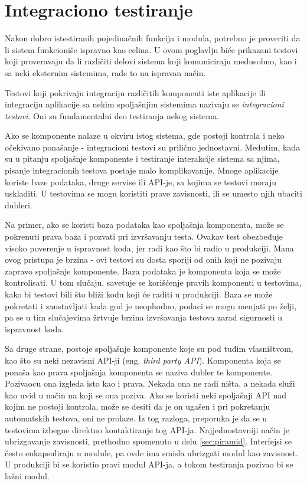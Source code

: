 \documentclass[12pt,oneside]{memoir}
\begin{document}
\section{Integraciono testiranje}
\label{sec:integration}
\par Nakon dobro istestiranih pojedinačnih funkcija i modula, potrebno je proveriti da li sistem funkcioniše ispravno kao celina. U ovom poglavlju biće prikazani testovi koji proveravaju da li različiti delovi sistema koji komuniciraju međusobno, kao i sa neki eksternim sistemima, rade to na ispravan način. 
\par Testovi koji pokrivaju integraciju različitih komponenti iste aplikacije ili integraciju aplikacije sa nekim spoljašnjim sistemima nazivaju se \emph{ integracioni testovi}.  Oni su fundamentalni deo testiranja nekog sistema. 
\par Ako se komponente nalaze u okviru istog sistema, gde postoji kontrola i neko očekivano ponašanje - integracioni testovi su prilično jednostavni. Međutim, kada su u pitanju spoljašnje komponente i testiranje interakcije sistema sa njima, pisanje integracionih testova postaje malo komplikovanije. Mnoge aplikacije koriste baze podataka, druge servise ili API-je, sa kojima se testovi moraju uskladiti. U testovima se mogu koristiti prave zavisnosti, ili se umesto njih ubaciti dubleri.
\par Na primer, ako se koristi baza podataka kao spoljašnja komponenta, može se pokrenuti prava baza i pozvati pri izvršavanju testa. Ovakav test obezbeđuje visoko poverenje u ispravnost koda, jer radi kao što bi radio u produkciji. Mana ovog pristupa je brzina - ovi testovi su dosta sporiji od onih koji ne pozivaju zapravo spoljašnje komponente. Baza podataka je komponenta koja se može kontrolisati. U tom slučaju, savetuje se korišćenje pravih komponenti u testovima, kako bi testovi bili što bliži kodu koji će raditi u produkciji. Baza se može pokretati i zaustavljati kada god je neophodno, podaci se mogu menjati po želji, pa se u tim slučajevima žrtvuje brzina izvršavanja testova zarad sigurnosti u ispravnost koda.
\par Sa druge strane, postoje spoljašnje komponente koje su pod tuđim vlasništvom, kao što su neki nezavisni API-ji (eng. \emph{third party API}). Komponenta koja se ponaša kao prava spoljašnja komponenta se naziva dubler te komponente. Pozivaocu ona izgleda isto kao i prava. Nekada ona ne radi ništa, a nekada služi kao uvid u način na koji se ona poziva. Ako se koristi neki spoljašnji API nad kojim ne postoji kontrola, može se desiti da je on ugašen i pri pokretanju automatskih testova, oni ne prolaze. Iz tog razloga, preporuka je da se u testovima izbegne direktno kontaktiranje tog API-ja. Najjednostavniji način je ubrizgavanje zavisnosti, prethodno spomenuto u delu \ref{sec:piramid}. Interfejsi se često enkapsuliraju u module, pa ovde ima smisla ubrizgati modul kao zavisnost. U produkciji bi se koristio pravi modul API-ja, a tokom testiranja pozivao bi se lažni modul.
\end{document}
